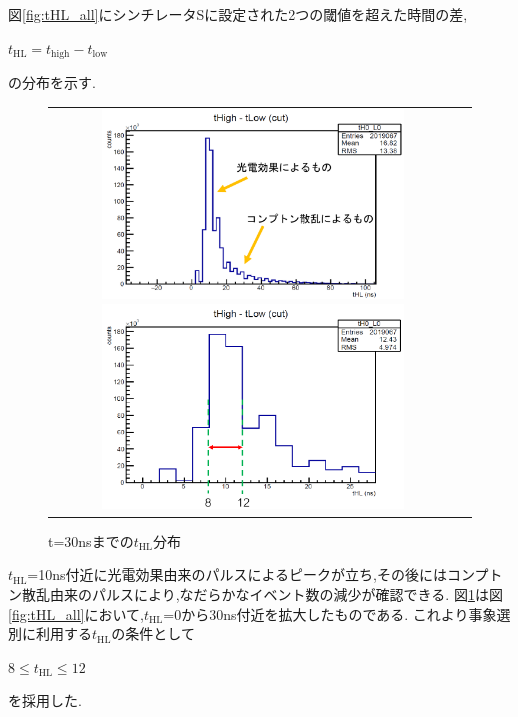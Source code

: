 図\ref{fig:tHL_all}にシンチレータSに設定された2つの閾値を超えた時間の差,
\begin{center}
	$t_\textrm{HL}=t_\textrm{high}-t_\textrm{low}$
\end{center}
の分布を示す.
\begin{figure}[htbp]
	\begin{tabular}{cc}
		\begin{minipage}[t]{0.5\hsize}
			\centering
				\includegraphics[width=80mm]{fig/isb/tHL.pdf}
				\caption{$t_\textrm{HL}$の分布}
				\label{fig:tHL_all}
		\end{minipage}
		\begin{minipage}[t]{0.5\hsize}
			\centering
				\includegraphics[width=80mm]{fig/isb/tHL_cut.pdf}
				\caption{t=30nsまでの$t_\textrm{HL}$分布}
				\label{fig:tHL_zoom}
		\end{minipage}
	\end{tabular}
\end{figure}

$t_\textrm{HL}$=10ns付近に光電効果由来のパルスによるピークが立ち,その後にはコンプトン散乱由来のパルスにより,なだらかなイベント数の減少が確認できる.
図\ref{fig:tHL_zoom}は図\ref{fig:tHL_all}において,$t_\textrm{HL}$=0から30ns付近を拡大したものである.
これより事象選別に利用する$t_\textrm{HL}$の条件として
\begin{center}
	$8\leq$$t_\textrm{HL}$$\leq12$
\end{center}
を採用した.
